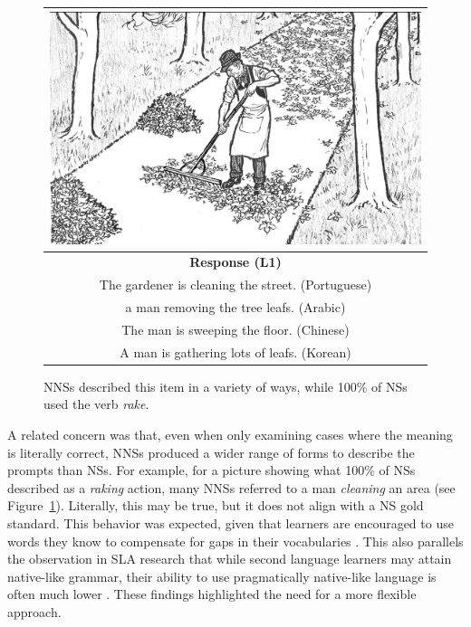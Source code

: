 \begin{figure}[htb!]
\begin{center}
\begin{tabular}{|c|}
\hline
\includegraphics[width=0.70\columnwidth]{figures/rake.jpg} \\
\hline
\textbf{Response (L1)} \\
\hline
The gardener is cleaning the street. (Portuguese)\\
\hline
a man removing the tree leafs. (Arabic)\\
\hline
The man is sweeping the floor. (Chinese)\\
\hline
A man is gathering lots of leafs. (Korean)\\
\hline
\end{tabular}
\end{center}
\caption{NNSs described this item in a variety of ways, while 100\% of NSs used the verb \textit{rake}.}
\label{fig:pilot-raking}
\end{figure}

A related concern was that, even when only examining cases
where the meaning is literally correct, NNSs produced a wider range of
forms to describe the prompts than NSs. For example, for a picture
showing what 100\% of NSs described as a \textit{raking} action,
many NNSs referred to a man \textit{cleaning} an area (see Figure~\ref{fig:pilot-raking}). Literally,
this may be true, but it does not align with a NS gold standard. 
This behavior was expected, given that learners are encouraged
to use words they know to compensate for gaps in their vocabularies
\citep{AgustinLlach2010}. This also parallels the observation in SLA research that while second language learners may attain native-like grammar, their ability to use
pragmatically native-like language is often much lower
\citep{BardoviDornyei1998}. These findings highlighted the need for a more flexible approach.


